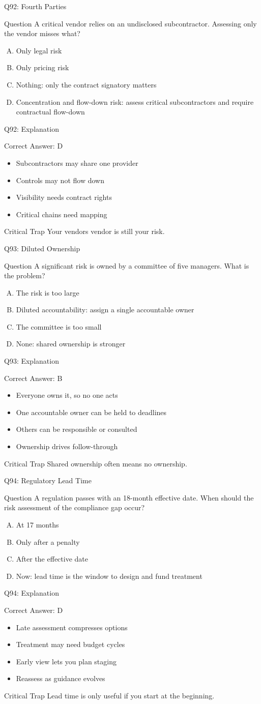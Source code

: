 \documentclass[aspectratio=169]{beamer}
\newcommand{\hq}[7]{%
  \begin{frame}{Q#1: #2}
    \begin{block}{Question}
      #3
    \end{block}
    \begin{enumerate}[(A)]
      #4
    \end{enumerate}
  \end{frame}
  \begin{frame}{Q#1: Explanation}
    \begin{block}{Correct Answer: #5}
      \begin{itemize}
        #6
      \end{itemize}
    \end{block}
    \begin{alertblock}{Critical Trap}
      #7
    \end{alertblock}
  \end{frame}
}
\begin{document}
\hq{92}{Fourth Parties}
{A critical vendor relies on an undisclosed subcontractor. Assessing only the vendor misses what?}
{\item Only legal risk
 \item Only pricing risk
 \item Nothing: only the contract signatory matters
 \item Concentration and flow-down risk: assess critical subcontractors and require contractual flow-down}
{D}
{\item Subcontractors may share one provider
 \item Controls may not flow down
 \item Visibility needs contract rights
 \item Critical chains need mapping}
{Your vendor\textquotesingle s vendor is still your risk.}

\hq{93}{Diluted Ownership}
{A significant risk is owned by a committee of five managers. What is the problem?}
{\item The risk is too large
 \item Diluted accountability: assign a single accountable owner
 \item The committee is too small
 \item None: shared ownership is stronger}
{B}
{\item Everyone owns it, so no one acts
 \item One accountable owner can be held to deadlines
 \item Others can be responsible or consulted
 \item Ownership drives follow-through}
{Shared ownership often means no ownership.}

\hq{94}{Regulatory Lead Time}
{A regulation passes with an 18-month effective date. When should the risk assessment of the compliance gap occur?}
{\item At 17 months
 \item Only after a penalty
 \item After the effective date
 \item Now: lead time is the window to design and fund treatment}
{D}
{\item Late assessment compresses options
 \item Treatment may need budget cycles
 \item Early view lets you plan staging
 \item Reassess as guidance evolves}
{Lead time is only useful if you start at the beginning.}
\end{document}
